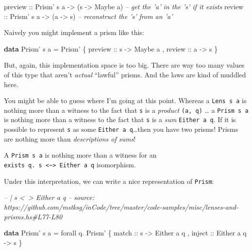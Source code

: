 \documentclass[]{article}
\newenvironment{Shaded}{}{}
\newcommand{\CommentTok}[1]{\textcolor[rgb]{0.38,0.63,0.69}{\textit{#1}}}
\newcommand{\DataTypeTok}[1]{\textcolor[rgb]{0.56,0.13,0.00}{#1}}
\newcommand{\FunctionTok}[1]{\textcolor[rgb]{0.02,0.16,0.49}{#1}}
\newcommand{\KeywordTok}[1]{\textcolor[rgb]{0.00,0.44,0.13}{\textbf{#1}}}
\newcommand{\NormalTok}[1]{#1}
\newcommand{\OtherTok}[1]{\textcolor[rgb]{0.00,0.44,0.13}{#1}}
\begin{document}
\begin{Shaded}
\begin{Highlighting}[]
\OtherTok{preview ::} \DataTypeTok{Prism'}\NormalTok{ s a }\OtherTok{->}\NormalTok{ (s }\OtherTok{->} \DataTypeTok{Maybe}\NormalTok{ a)   }\CommentTok{-- get the 'a' in the 's' if it exists}
\OtherTok{review  ::} \DataTypeTok{Prism'}\NormalTok{ s a }\OtherTok{->}\NormalTok{ (a }\OtherTok{->}\NormalTok{ s)         }\CommentTok{-- reconstruct the 's' from an 'a'}
\end{Highlighting}
\end{Shaded}

Naively you might implement a prism like this:

\begin{Shaded}
\begin{Highlighting}[]
\KeywordTok{data} \DataTypeTok{Prism'}\NormalTok{ s a }\FunctionTok{=} \DataTypeTok{Prism'}
\NormalTok{    \{}\OtherTok{ preview ::}\NormalTok{ s }\OtherTok{->} \DataTypeTok{Maybe}\NormalTok{ a}
\NormalTok{    ,}\OtherTok{ review  ::}\NormalTok{ a }\OtherTok{->}\NormalTok{ s}
\NormalTok{    \}}
\end{Highlighting}
\end{Shaded}

But, again, this implementation space is too big. There are way too many values
of this type that aren't \emph{actual} ``lawful'' prisms. And the laws are kind
of muddled here.

You might be able to guess where I'm going at this point. Whereas a
\texttt{Lens\textquotesingle{}\ s\ a} is nothing more than a witness to the fact
that \texttt{s} is a \emph{product} \texttt{(a,\ q)} \ldots{} a
\texttt{Prism\textquotesingle{}\ s\ a} is nothing more than a witness to the
fact that \texttt{s} is a \emph{sum} \texttt{Either\ a\ q}. If it is possible to
represent \texttt{s} as some \texttt{Either\ a\ q}\ldots{}then you have two
prisms! Prisms are nothing more than \emph{descriptions of sums}!

A \texttt{Prism\textquotesingle{}\ s\ a} is nothing more than a witness for an
\texttt{exists\ q.\ s\ \textless{}\textasciitilde{}\textgreater{}\ Either\ a\ q}
isomorphism.

Under this interpretation, we can write a nice representation of
\texttt{Prism\textquotesingle{}}:

\begin{Shaded}
\begin{Highlighting}[]
\CommentTok{-- | s <~> Either a q}
\CommentTok{-- source: https://github.com/mstksg/inCode/tree/master/code-samples/misc/lenses-and-prisms.hs#L77-L80}

\KeywordTok{data} \DataTypeTok{Prism'}\NormalTok{ s a }\FunctionTok{=}\NormalTok{ forall q}\FunctionTok{.} \DataTypeTok{Prism'}
\NormalTok{    \{}\OtherTok{ match  ::}\NormalTok{ s }\OtherTok{->} \DataTypeTok{Either}\NormalTok{ a q}
\NormalTok{    ,}\OtherTok{ inject ::} \DataTypeTok{Either}\NormalTok{ a q }\OtherTok{->}\NormalTok{ s}
\NormalTok{    \}}
\end{Highlighting}
\end{Shaded}
\end{document}
